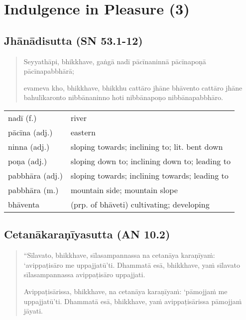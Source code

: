 \documentclass[11pt,oneside]{memoir}
\begin{document}
\normalArrayStrech

\chapter{Indulgence in Pleasure (3)}
\label{sec:org3979e75}
\section{Jhānādisutta (SN 53.1-12)}
\label{sec:org2b63b27}

\begin{quote}
Seyyathāpi, bhikkhave, gaṅgā nadī pācīnaninnā pācīnapoṇā pācīnapabbhārā;

evameva kho, bhikkhave, bhikkhu cattāro jhāne bhāvento cattāro jhāne
bahulīkaronto nibbānaninno hoti nibbānapoṇo nibbānapabbhāro.
\end{quote}

\begin{longtable}{L{\colOne} L{\colTwo}}
nadī (f.) & river\\[0pt]
pācīna (adj.) & eastern\\[0pt]
ninna (adj.) & sloping towards; inclining to; lit. bent down\\[0pt]
poṇa (adj.) & sloping down to; inclining down to; leading to\\[0pt]
pabbhāra (adj.) & sloping towards; inclining towards; leading to\\[0pt]
pabbhāra (m.) & mountain side; mountain slope\\[0pt]
bhāventa & (prp. of bhāveti) cultivating; developing\\[0pt]
\end{longtable}

\section{Cetanākaraṇīyasutta (AN 10.2)}
\label{sec:orge5d3f09}

\begin{quote}
“Sīlavato, bhikkhave, sīlasampannassa na cetanāya karaṇīyaṁ: ‘avippaṭisāro me
uppajjatū’ti. Dhammatā esā, bhikkhave, yaṁ sīlavato sīlasampannassa avippaṭisāro
uppajjati.

Avippaṭisārissa, bhikkhave, na cetanāya karaṇīyaṁ: ‘pāmojjaṁ me uppajjatū’ti.
Dhammatā esā, bhikkhave, yaṁ avippaṭisārissa pāmojjaṁ jāyati.
\end{quote}
\end{document}
